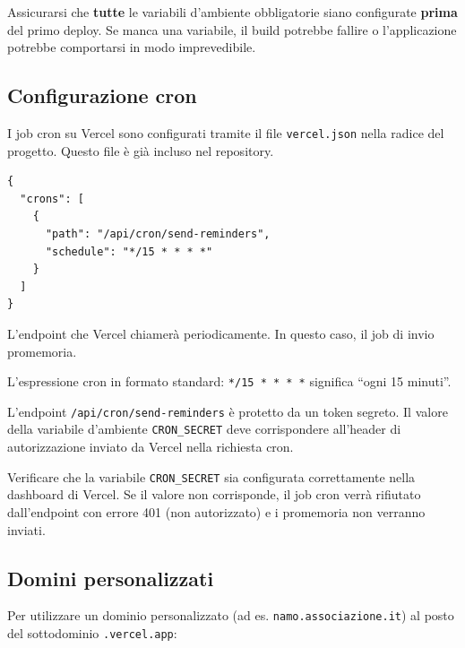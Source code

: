 \documentclass[a4paper,11pt,oneside]{book}
\begin{document}
\begin{warningbox}
Assicurarsi che \textbf{tutte} le variabili d'ambiente obbligatorie siano configurate \textbf{prima} del primo deploy. Se manca una variabile, il build potrebbe fallire o l'applicazione potrebbe comportarsi in modo imprevedibile.
\end{warningbox}

\subsection{Configurazione cron}
\label{sec:vercel-cron}

I job cron su Vercel sono configurati tramite il file \texttt{vercel.json} nella radice del progetto. Questo file \`e gi\`a incluso nel repository.

\begin{verbatim}
{
  "crons": [
    {
      "path": "/api/cron/send-reminders",
      "schedule": "*/15 * * * *"
    }
  ]
}
\end{verbatim}

\begin{description}[leftmargin=1.5em, style=nextline]
  \item[\texttt{path}] L'endpoint che Vercel chiamer\`a periodicamente. In questo caso, il job di invio promemoria.
  \item[\texttt{schedule}] L'espressione cron in formato standard: \texttt{*/15 * * * *} significa ``ogni 15 minuti''.
\end{description}

L'endpoint \texttt{/api/cron/send-reminders} \`e protetto da un token segreto. Il valore della variabile d'ambiente \texttt{CRON\_SECRET} deve corrispondere all'header di autorizzazione inviato da Vercel nella richiesta cron.

\begin{warningbox}
Verificare che la variabile \texttt{CRON\_SECRET} sia configurata correttamente nella dashboard di Vercel. Se il valore non corrisponde, il job cron verr\`a rifiutato dall'endpoint con errore 401 (non autorizzato) e i promemoria non verranno inviati.
\end{warningbox}

\subsection{Domini personalizzati}
\label{sec:vercel-domini}

Per utilizzare un dominio personalizzato (ad es. \texttt{namo.associazione.it}) al posto del sottodominio \texttt{.vercel.app}:
\end{document}
